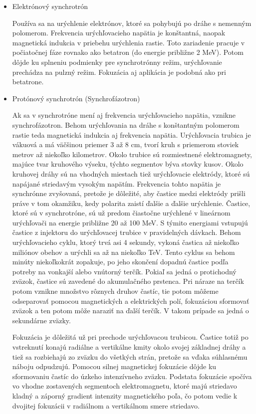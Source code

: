 \documentclass[../../main.tex]{subfiles}
\begin{document}
\begin{itemize}
\item Elektrónový synchrotrón

Používa sa na urýchlenie elektrónov, ktoré sa pohybujú po dráhe s nemenným polomerom. Frekvencia urýchľovacieho napätia je konštantná, naopak magnetická indukcia v priebehu urýchlenia rastie. Toto zariadenie pracuje v počiatočnej fáze rovnako ako betatron (do energie približne 2 MeV). Potom dôjde ku splneniu podmienky pre synchrotrónny režim, urýchľovanie prechádza na pulzný režim. Fokuzácia aj aplikácia je podobná ako pri betatrone.

\item Protónový synchrotrón (Synchrofázotron)

Ak sa v synchrotróne mení aj frekvencia urýchľovacieho napätia, vznikne synchrofázotron. Behom urýchľovania na dráhe s konštantným polomerom rastie teda magnetická indukcia aj frekvencia napätia. Urýchľovacia trubica je vákuová a má väčšinou priemer 3 až 8 cm, tvorí kruh s priemerom stoviek metrov až niekoľko kilometrov. Okolo trubice sú rozmiestnené elektromagnety, majúce tvar kruhového výseku, týchto segmentov býva stovky kusov. Okolo kruhovej dráhy sú na vhodných miestach tiež urýchľovacie elektródy, ktoré sú napájané striedavým vysokým napätím. Frekvencia tohto napätia je synchrónne zvyšovaná, pretože je dôležité, aby častice medzi elektródy prišli práve v tom okamžiku, kedy polarita zaistí ďalšie a ďalšie urýchlenie. Častice, ktoré sú v synchrotróne, sú už predom čiastočne urýchlené v lineárnom urýchľovači na energie približne 20 až 100 MeV. S týmito energiami vstupujú častice z injektoru do urýchľovacej trubice v pravidelných dávkach. Behom urýchľovacieho cyklu, ktorý trvá asi 4 sekundy, vykoná častica až niekoľko miliónov obehov a urýchli sa až na niekoľko TeV. Tento cyklus sa behom minúty niekoľkokrát zopakuje, po jeho skončení dopadnú častice podľa potreby na vonkajší alebo vnútorný terčík. Pokiaľ sa jedná o protichodný zväzok, častice sú zavedené do akumulačného prstenca. Pri náraze na terčík potom vznikne množstvo rôznych druhov častíc, tie potom môžeme odseparovať pomocou magnetických a elektrických polí, fokuzáciou sformovať zväzok a ten potom môže naraziť na ďalší terčík. V takom prípade sa jedná o sekundárne zväzky.

Fokuzácia je dôležitá už pri prechode urýchľovacou trubicou. Častice totiž po vstreknutí konajú radiálne a vertikálne kmity okolo svojej základnej dráhy a tiež sa rozbiehajú zo zväzku do všetkých strán, pretože sa vďaka súhlasnému náboju odpudzujú. Pomocou silnej magnetickej fokuzácie dôjde ku sformovaniu častíc do úzkeho intenzívneho zväzku. Podstata fokuzácie spočíva vo vhodne zostavených segmentoch elektromagnetu, ktoré majú striedavo kladný a záporný gradient intenzity magnetického poľa, čo potom vedie k dvojitej fokuzácii v radiálnom a vertikálnom smere striedavo.
 
\end{itemize}
\end{document}
